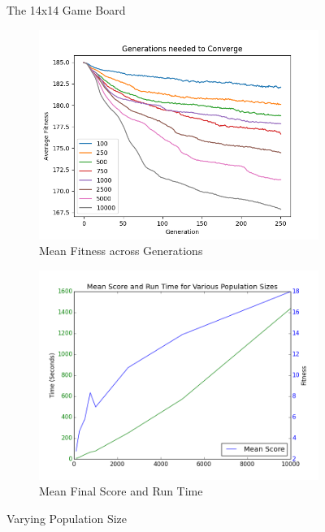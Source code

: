 \documentclass{article}
\begin{document}
\begin{figure}[ht]
\caption{The 14x14 Game Board}
\label{fig:game_board}
\end{figure}

\begin{figure}[ht]
\centering
\begin{subfigure}{0.5\textwidth}
\centering
\includegraphics[width=1\textwidth]{Figures/convergence}
\caption{Mean Fitness across Generations}
\label{fig:pop_convergence}
\end{subfigure}%
\begin{subfigure}{0.5\textwidth}
\centering
\includegraphics[width=1\textwidth]{Figures/meanscore_v_runtime}
\caption{Mean Final Score and Run Time}
\label{fig:meanscore_v_runtime}
\end{subfigure}

\caption{Varying Population Size}
\label{fig:varying_population_size}
\end{figure}
\end{document}
